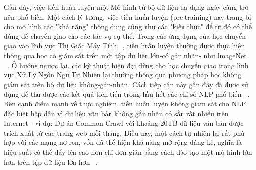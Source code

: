 \documentclass[conference]{IEEEtran}
\begin{document}
Gần đây,  việc tiền huấn luyện một Mô hình từ bộ dữ liệu đa dạng ngày càng trở nên phổ biến. Một cách lý tưởng,  việc tiền huấn luyện (pre-training) này trang bị cho mô hình các "khả năng" thông dụng cũng như các "kiến thức" để từ đó có thể dùng để chuyển giao cho các tác vụ cụ thể.  Trong các ứng dụng của học chuyển giao vào lĩnh vực Thị Giác Máy Tính ~\cite{oquab2014learning, thrun2004advances, minyoung2016ImageNet}, tiền huấn luyện thường được thực hiện thông qua học có giám sát trên một tập dữ liệu lớn-có gán nhãn- như ImageNet ~\cite{Deng2009ImageNet, Russakovsky2015ImageNet}.  Ở hướng ngược lại,  các  kỹ thuật hiện đại dùng cho học chuyển giao trong lĩnh vực Xử Lý Ngôn Ngữ Tự Nhiên lại thường thông qua  phương pháp học không giám sát trên bộ dữ liệu không-gán-nhãn. Cách tiếp cận này gần đây đã được sử dụng để thu được các kết quả tiên tiến trong hầu hết các chỉ số NLP phổ biến ~\cite{kentonbert, dong2019unified, liu2019roberta}.  Bên cạnh điểm mạnh về thực nghiệm,  tiền huấn luyện không giám sát cho NLP đặc biệt hấp dẫn vì dữ liệu văn bản không gắn nhãn có sẵn rất nhiều trên Internet - ví dụ: Dự án Common Crawl với khoảng 20TB dữ liệu văn bản được trích xuất từ các trang web mỗi tháng.  Điều này, một cách tự nhiên lại rất phù hợp với các mạng nơ-ron, vốn đã thể hiện khả năng mở rộng đáng kể, nghĩa là hiệu suất có thể đẩy lên cao  hơn chỉ đơn giản bằng cách đào tạo một mô hình lớn hơn trên tập dữ liệu lớn hơn ~\cite{hestnessdeep, shazeer2017outrageously, jozefowicz2016exploring, mahajan2018exploring, radford2019language}.



\end{document}

